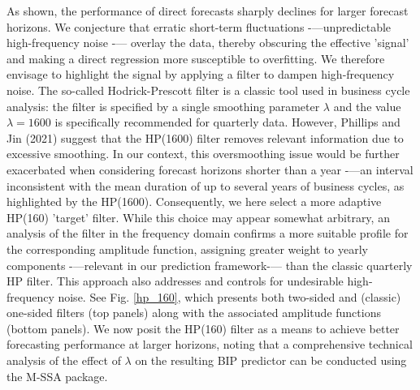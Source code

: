 \documentclass[a4paper]{article}
\begin{document}
As shown, the performance of direct forecasts sharply declines for larger forecast horizons. We conjecture that erratic short-term fluctuations -—unpredictable high-frequency noise -— overlay the data, thereby obscuring the effective 'signal' and making a direct regression more susceptible to overfitting. We therefore envisage to highlight the signal by applying a filter to dampen high-frequency noise. 
The so-called Hodrick-Prescott filter is a classic tool used in business cycle analysis: the filter is specified by a single smoothing parameter $\lambda$ and the value $\lambda=1600$ is specifically recommended for quarterly data. However, Phillips and Jin (2021) suggest that the HP(1600) filter removes relevant information due to excessive smoothing.  In our context, this oversmoothing issue would be further exacerbated when considering forecast horizons shorter than a year -—an interval inconsistent with the mean duration of up to several years of business cycles, as highlighted by the HP(1600). Consequently, we here select a more adaptive HP(160) 'target' filter. 
While this choice may appear somewhat arbitrary, an analysis of the filter in the frequency domain confirms a more suitable profile for the corresponding amplitude function, assigning greater weight to yearly components -—relevant in our prediction framework-— than the classic quarterly HP filter. This approach also addresses and controls for undesirable high-frequency noise. See Fig. \ref{hp_160}, which presents both two-sided and (classic) one-sided filters (top panels) along with the associated amplitude functions (bottom panels). We now posit the HP(160) filter as a means to achieve better forecasting performance at larger horizons, noting that a comprehensive technical analysis of the effect of $\lambda$ on the resulting BIP predictor can be conducted using the M-SSA package. 
\end{document}
